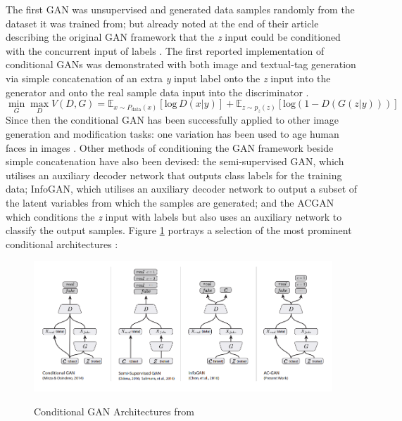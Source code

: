 \documentclass[a4paper, titlepage]{article}
\begin{document}
The first \ac{GAN} was unsupervised and generated data samples randomly from the dataset it was trained from; but \citeauthor{2014arXiv1406.2661G} already noted at the end of their article describing the original \ac{GAN} framework that the \textit{z} input could be conditioned with the concurrent input of labels \citep{2014arXiv1406.2661G}.
\newline
\newline
The first reported implementation of conditional \ac{GAN}s was demonstrated with both image and textual-tag generation via simple concatenation of an extra \textit{y} input label onto the \textit{z} input into the generator and onto the real sample data input into the discriminator \citep{2014arXiv1411.1784M}.
\newline
%
\begin{equation}
  \min_{G} \max_{D} V(D,G) = \mathbb{E}_{x \sim P_\mathrm{data}(x)}[\mathrm{log}\,D(x|y)] + \mathbb{E}_{z \sim p_z(z)}[\mathrm{log} (1 - D(G(z|y)))]
\end{equation}
%
\newline
Since then the conditional \ac{GAN} has been successfully applied to other image generation and modification tasks: one variation has been used to age human faces in images \citep{2017arXiv170201983A}.
\newline
\newline
Other methods of conditioning the \ac{GAN} framework beside simple concatenation have also been devised: the semi-supervised \ac{GAN}, which utilises an auxiliary decoder network that outputs class labels for the training data; InfoGAN, which utilises an auxiliary decoder network to output a subset of the latent variables from which the samples are generated; and the \ac{ACGAN} which conditions the \textit{z} input with labels but also uses an auxiliary network to classify the output samples.
\newline
\newline
Figure \ref{condGANs} portrays a selection of the most prominent conditional architectures \citep{2016arXiv161009585O}:
%
\begin{figure}[ht]
  \caption{Conditional GAN Architectures from \citeauthor{2016arXiv161009585O}}
  \centering
  \includegraphics[width=1\textwidth]{Conditional_Architectures}
  \label{condGANs}
\end{figure}
\end{document}
